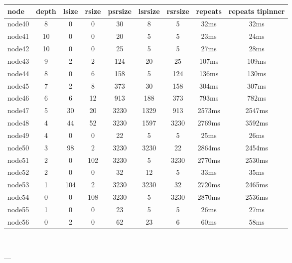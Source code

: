 \begin{tabular}{|l|c|c|c|c|c|c|c|c|}
\hline node & depth & lsize & rsize & psrsize & lsrsize & rsrsize   & repeats & repeats tipinner\\
    \hline node40 & 8 & 0 & 0 & 30 & 8 & 5 & 32ms & 32ms\\
    \hline node41 & 10 & 0 & 0 & 20 & 5 & 5 & 23ms & 24ms\\
    \hline node42 & 10 & 0 & 0 & 25 & 5 & 5 & 27ms & 28ms\\
    \hline node43 & 9 & 2 & 2 & 124 & 20 & 25 & 107ms & 109ms\\
    \hline node44 & 8 & 0 & 6 & 158 & 5 & 124 & 136ms & 130ms\\
    \hline node45 & 7 & 2 & 8 & 373 & 30 & 158 & 304ms & 307ms\\
    \hline node46 & 6 & 6 & 12 & 913 & 188 & 373 & 793ms & 782ms\\
    \hline node47 & 5 & 30 & 20 & 3230 & 1329 & 913 & 2573ms & 2547ms\\
    \hline node48 & 4 & 44 & 52 & 3230 & 1597 & 3230 & 2769ms & 3592ms\\
    \hline node49 & 4 & 0 & 0 & 22 & 5 & 5 & 25ms & 26ms\\
    \hline node50 & 3 & 98 & 2 & 3230 & 3230 & 22 & 2864ms & 2454ms\\
    \hline node51 & 2 & 0 & 102 & 3230 & 5 & 3230 & 2770ms & 2530ms\\
    \hline node52 & 2 & 0 & 0 & 32 & 12 & 5 & 33ms & 35ms\\
    \hline node53 & 1 & 104 & 2 & 3230 & 3230 & 32 & 2720ms & 2465ms\\
    \hline node54 & 0 & 0 & 108 & 3230 & 5 & 3230 & 2870ms & 2536ms\\
    \hline node55 & 1 & 0 & 0 & 23 & 5 & 5 & 26ms & 27ms\\
    \hline node56 & 0 & 2 & 0 & 62 & 23 & 6 & 60ms & 58ms\\

\hline
\end{tabular} \

---


